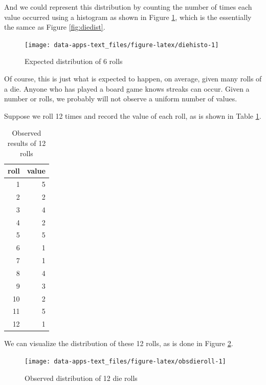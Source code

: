 \documentclass[
]{book}
\begin{document}
And we could represent this distribution by counting the number of times each value occurred using a histogram as shown in Figure \ref{fig:diehisto}, which is the essentially the samce as Figure \ref{fig:diedist}.

\begin{figure}

{\centering \texttt{[image: data-apps-text\_files/figure-latex/diehisto-1]} 

}

\caption{Expected distribution of 6 rolls}\label{fig:diehisto}
\end{figure}

Of course, this is just what is expected to happen, on average, given many rolls of a die. Anyone who has played a board game knows streaks can occur. Given a number or rolls, we probably will not observe a uniform number of values.

Suppose we roll 12 times and record the value of each roll, as is shown in Table \ref{tab:obsdietable}.

\begin{table}

\caption{\label{tab:obsdietable}Observed results of 12 rolls}
\centering
\begin{tabular}[t]{r|r}
\hline
roll & value\\
\hline
1 & 5\\
\hline
2 & 2\\
\hline
3 & 4\\
\hline
4 & 2\\
\hline
5 & 5\\
\hline
6 & 1\\
\hline
7 & 1\\
\hline
8 & 4\\
\hline
9 & 3\\
\hline
10 & 2\\
\hline
11 & 5\\
\hline
12 & 1\\
\hline
\end{tabular}
\end{table}

We can visualize the distribution of these 12 rolls, as is done in Figure \ref{fig:obsdieroll}.

\begin{figure}

{\centering \texttt{[image: data-apps-text\_files/figure-latex/obsdieroll-1]} 

}

\caption{Observed distribution of 12 die rolls}\label{fig:obsdieroll}
\end{figure}
\end{document}
